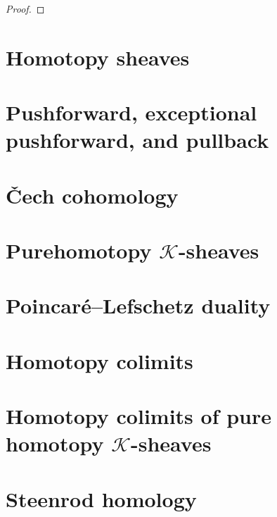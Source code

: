 \begin{proof}

\end{proof}








\chapter{Homotopy sheaves}

\chapter{Pushforward, exceptional pushforward, and pullback}

\chapter{\v{C}ech cohomology}

\chapter{Purehomotopy $\mathcal{K}$-sheaves}

\chapter{Poincaré–Lefschetz duality}

\chapter{Homotopy colimits}

\chapter{Homotopy colimits of pure homotopy $\mathcal{K}$-sheaves}

\chapter{Steenrod homology}